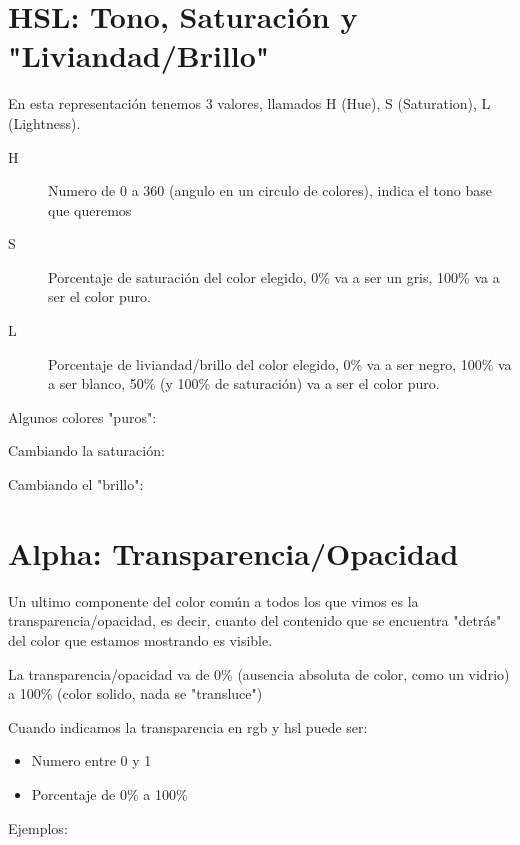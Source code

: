\documentclass[letterpaper,10pt,spanish]{sphinxmanual}
\begin{document}
\section{HSL: Tono, Saturación y "Liviandad/Brillo"}
\label{\detokenize{colores:hsl-tono-saturacion-y-liviandad-brillo}}
En esta representación tenemos 3 valores, llamados H (Hue), S (Saturation), L (Lightness).
\begin{description}
\item[{H}] \leavevmode
Numero de 0 a 360 (angulo en un circulo de colores), indica el tono base que queremos

\item[{S}] \leavevmode
Porcentaje de saturación del color elegido, 0\% va a ser un gris, 100\% va a ser el color puro.

\item[{L}] \leavevmode
Porcentaje de liviandad/brillo del color elegido, 0\% va a ser negro, 100\% va a
ser blanco, 50\% (y 100\% de saturación) va a ser el color puro.

\end{description}

Algunos colores "puros":



Cambiando la saturación:



Cambiando el "brillo":




\section{Alpha: Transparencia/Opacidad}
\label{\detokenize{colores:alpha-transparencia-opacidad}}
Un ultimo componente del color común a todos los que vimos es la
transparencia/opacidad, es decir, cuanto del contenido que se encuentra
"detrás" del color que estamos mostrando es visible.

La transparencia/opacidad va de 0\% (ausencia absoluta de color, como un vidrio) a 100\% (color solido, nada se "transluce")

Cuando indicamos la transparencia en rgb y hsl puede ser:
\begin{itemize}
\item {} 
Numero entre 0 y 1

\item {} 
Porcentaje de 0\% a 100\%

\end{itemize}

Ejemplos:
\end{document}
